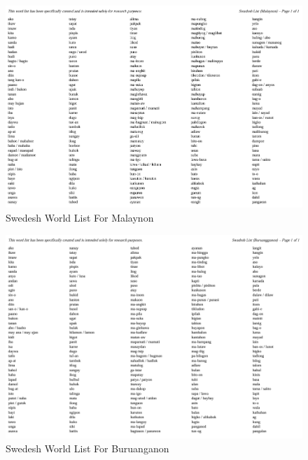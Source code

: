 \begin{figure}[h!]
	\centering
	\includegraphics[width=\textwidth]{./appendix/swadesh_malaynon.png}
	\caption{Swedesh World List For Malaynon}
	\label{fig:swadeshMalaynon}
\end{figure}

\begin{figure}[h!]
	\centering
	\includegraphics[width=\textwidth]{./appendix/swadesh_buruanganon.png}
	\caption{Swedesh World List For Buruanganon}
	\label{fig:swadeshBuruanganon}
\end{figure}

%


